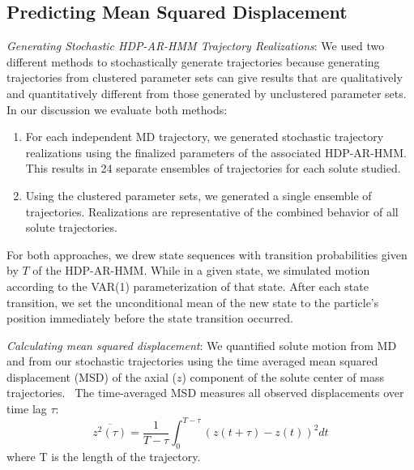 \documentclass[journal=jpcbfk,manuscript=article]{achemso}
\begin{document}
  \subsection{Predicting Mean Squared Displacement}\label{method:realizations}
  \textit{Generating Stochastic HDP-AR-HMM Trajectory Realizations}: We used two 
  different methods to stochastically generate trajectories because generating
  trajectories from clustered parameter sets can give results that are qualitatively 
  and quantitatively different from those generated by unclustered parameter sets.
  In our discussion we evaluate both methods:
  \begin{enumerate}[label={Method \theenumi :}, leftmargin=3.5\parindent]
    \item For each independent MD trajectory, we generated stochastic trajectory
    realizations using the finalized parameters of the associated HDP-AR-HMM. This 
    results in 24 separate ensembles of trajectories for each solute studied. 
    \item Using the clustered parameter sets, we generated a single ensemble
	of trajectories. Realizations are representative of the combined behavior
	of all solute trajectories.
  \end{enumerate}
  
  For both approaches, we drew state sequences with transition probabilities given 
  by $T$ of the HDP-AR-HMM. While in a given state, we simulated motion according to the 
  VAR(1) parameterization of that state. After each state transition, we set the 
  unconditional mean of the new state to the particle's position immediately before
  the state transition occurred.
  
  \textit{Calculating mean squared displacement}: We quantified solute motion from
  MD and from our stochastic trajectories using the time averaged mean squared 
  displacement (MSD) of the axial ($z$) component of the solute center of mass
  trajectories.~\cite{meroz_toolbox_2015} The time-averaged MSD measures all observed 
  displacements over time lag $\tau$:
  \begin{equation}
  	\overline{z^2(\tau)} = \dfrac{1}{T - \tau}\int_{0}^{T - \tau} (z(t + \tau) - z(t))^2 dt
  \label{eqn:tamsd}
  \end{equation}
  where T is the length of the trajectory. 
  
\end{document}
